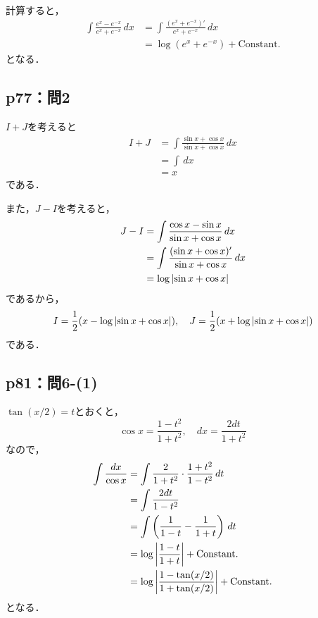 \documentclass[uplatex,dvipdfmx,a4paper,10pt,fleqn]{jsarticle}
\newenvironment{tleftbar}{\begin{tbleftline}\setlength{\parindent}{1zw}}{\end{tbleftline}}
\begin{document}
\begin{tleftbar}
    計算すると，
    \begin{align*} 
        \int \frac{e^x-e^{-x}}{e^x+e^{-x}}  \, dx & = \int \frac{(e^x+e^{-x})'}{e^x+e^{-x}} \, dx \\
        & = \log (e^x + e^{-x})+\mathrm{Constant.}
    \end{align*} 
    となる．
\end{tleftbar}


\subsection*{p77：問2}

\begin{tleftbar}
    $I+J$を考えると
    \begin{align*} 
        I + J & = \int \frac{\sin x+\cos x}{\sin x + \cos x} \, dx \\
        & = \int \, dx \\
        & = x
    \end{align*} 
    である．

    また，$ J-I$を考えると，
    \begin{align*} 
        J - I & = \int \frac{\cos x -\sin x}{\sin x + \cos x} \, dx \\
        & = \int \frac{(\sin x + \cos x)'}{\sin x + \cos x} \, dx \\
        & = \log \abs{\sin x+\cos x}
    \end{align*}
    であるから，
    \[
        I = \frac{1}{2}(x- \log \abs{\sin x + \cos x}),\quad J = \frac{1}{2} ( x + \log \abs{\sin x + \cos x})
    \]
    である．
\end{tleftbar}

\subsection*{p81：問6-(1)}

\begin{tleftbar}
    $ \tan (x/2)=t$とおくと，
    \[
        \cos x = \frac{1-t^2}{1+t^2} ,\quad dx = \frac{2dt}{1+t^2}
    \]
    なので，
    \begin{align*} 
    \int \frac{dx}{\cos x} & = \int \frac{2}{1+t^2} \cdot \frac{1+t^2}{1-t^2} \, dt \\
    & = \int \frac{2dt}{1-t^2} \\
    & = \int \left ( \frac{1}{1-t}-\frac{1}{1+t} \right) \, dt\\
    & = \log \abs{\frac{1-t}{1+t}} + \mathrm{Constant.} \\
    & = \log \abs{\frac{1-\tan (x/2)}{1+\tan (x/2)}}+\mathrm{Constant.} 
    \end{align*}
    となる．
\end{tleftbar}
\end{document}
